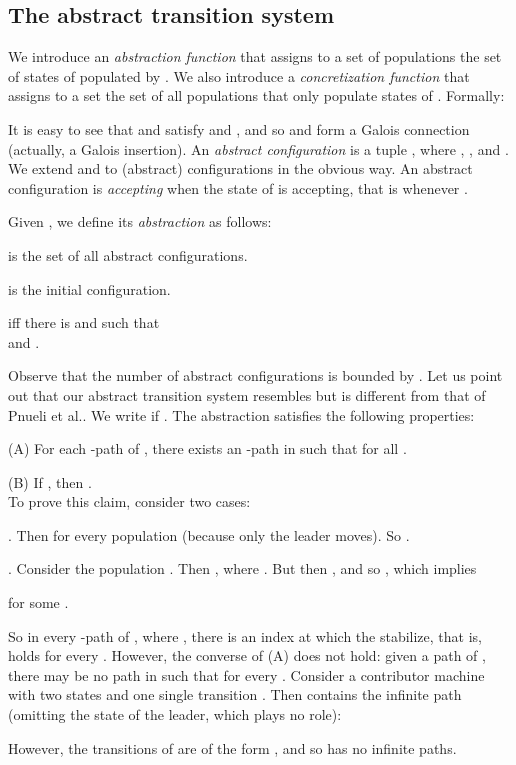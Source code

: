 \documentclass{llncs}
\begin{document}
\subsection{The abstract transition system} 
\label{subsec:absTS} 
We introduce an {\em abstraction function}  that assigns to a set  of populations
the set of states of  populated by . We also introduce a
{\em concretization function}  that assigns to a set  the set of  
all populations  that only populate states of . Formally:
{
\setlength\abovedisplayskip{1pt}
\setlength\belowdisplayskip{1pt}

}
\noindent It is easy to see that  and  satisfy  
and , and so  and  form a Galois connection 
(actually, a Galois insertion). 
An {\em abstract configuration} is a tuple , where , , and . 
We extend  and  to (abstract) configurations in the obvious way.
An abstract configuration is \emph{accepting} when the state of  is accepting, that is whenever .

Given , we define its  {\em abstraction} 
 as follows: 
\begin{compactitem}
\item  is the set of all abstract configurations.
\item 
is the initial configuration.
\item  if{}f
there is  and  such that \\ 
 and
.
\end{compactitem}
Observe that the number of abstract configurations 
is bounded by . 
Let us point out that our abstract transition system resembles but is different from that of Pnueli et al.\cite{PnueliXZ02}.
We write  if . 
The abstraction satisfies the following properties:
\begin{compactitem}
\item[(A)] For each -path  of , 
there exists an -path
 in  such that 
 for all .
\item[(B)] If , then . \\
To prove this claim, consider two cases:
\begin{compactitem}
\item . Then 
for every population  (because only the leader moves). So 
. 
\item . Consider the population 
. Then 
, where 
. But 
then , and so 
, which implies 

for some . 
\end{compactitem}
\end{compactitem}
\noindent So in every -path  
of , where , there is an index
 at which the  stabilize, that is,   holds for every .
However, the converse of (A) does not hold: given a path
 of , there may
be no path  in  such that
 for every . 
Consider a contributor machine  with two states  and one single transition
. Then  contains the infinite path (omitting the 
state of the leader, which plays no role):
{
\setlength\abovedisplayskip{1pt}
\setlength\belowdisplayskip{1pt}

}
\noindent 
However, the transitions of  are of the form
, 
and so  has no infinite paths.
\end{document}
